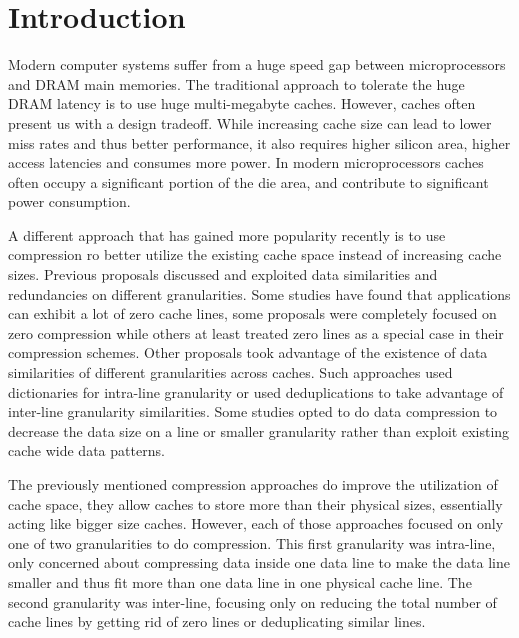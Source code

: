 
\chapter{Introduction}
\label{ch:Introduction}

Modern computer systems suffer from a huge speed gap between microprocessors and DRAM main memories. The traditional approach to tolerate the huge DRAM latency is to use huge multi-megabyte caches. However, caches often present us with a design tradeoff. While increasing cache size can lead to lower miss rates and thus better performance, it also requires higher silicon area, higher access latencies and consumes more power\cite{skadron1999branch}. In modern microprocessors caches often occupy a significant portion of the die area, and contribute to significant power consumption\cite{skylake,power9}.\par
A different approach that has gained more popularity recently is to use compression ro better utilize the existing cache space instead of increasing cache sizes. Previous proposals discussed and exploited data similarities and redundancies on different granularities. Some studies have found that applications can exhibit a lot of zero cache lines, some proposals were completely focused on zero compression\cite{zca} while others at least treated zero lines as a special case in their compression schemes\cite{fpc, hycomp, dedup}. Other proposals took advantage of the existence of data similarities of different granularities across caches. Such approaches used dictionaries for intra-line granularity\cite{cpack, dish} or used deduplications\cite{dedup} to take advantage of inter-line granularity similarities. Some studies opted to do data compression to decrease the data size on a line or smaller granularity rather than exploit existing cache wide data patterns\cite{bdi, sc2, hycomp}.\par
The previously mentioned compression approaches do improve the utilization of cache space, they allow caches to store more than their physical sizes, essentially acting like bigger size caches. However, each of those approaches focused on only one of two granularities to do compression. This first granularity was intra-line, only concerned about compressing data inside one data line to make the data line smaller and thus fit more than one data line in one physical cache line. The second granularity was inter-line, focusing only on reducing the total number of cache lines by getting rid of zero lines or deduplicating similar lines.\par
